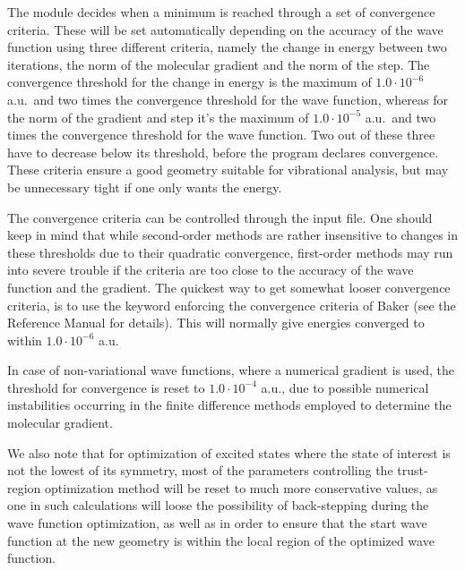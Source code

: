 The  module decides when a minimum is reached through a
set of convergence criteria. These will be
set automatically depending on the accuracy of the wave function
using three different criteria, namely the change in energy
between two iterations, the norm of the molecular
gradient and the norm of the
step. The convergence threshold for the change
in energy is the maximum of $1.0\cdot 10^{-6}$ a.u.\ and two times the
convergence threshold for the wave function, whereas for the norm of
the gradient and step it's the maximum of $1.0\cdot 10^{-5}$ a.u.\ and
two times the 
convergence threshold for the wave function. Two out of these
three have to decrease below its threshold, before the program
declares convergence. These criteria ensure a good geometry
suitable for vibrational analysis, but may be unnecessary tight if
one only wants the energy.

The convergence criteria can be controlled through the input file. One
should keep in mind that while second-order methods are rather
insensitive to changes in these thresholds due to their quadratic
convergence, first-order methods may run into severe trouble if the
criteria are too close to the accuracy of the wave function and the
gradient. The quickest way to get somewhat looser convergence
criteria, is to use the keyword  enforcing the convergence
criteria of Baker\cite{Baker} (see the Reference Manual for
details). This will normally give energies converged to within
$1.0\cdot 10^{-6}$ a.u.

In case of non-variational
wave functions, where a numerical gradient is used, the threshold for convergence is reset to
$1.0\cdot 10^{-4}$ a.u., due to possible numerical instabilities
occurring 
in the 
finite difference methods employed to
determine the molecular gradient.

We also note that for optimization of excited states where the state of interest is not the lowest of its
symmetry, most of the parameters controlling the trust-region
optimization method will be reset to much more conservative
values, as one in such calculations will loose the possibility of
back-stepping during the wave function optimization, as well as in
order to ensure that the start wave function at the new geometry
is within the local region of the optimized wave function.

